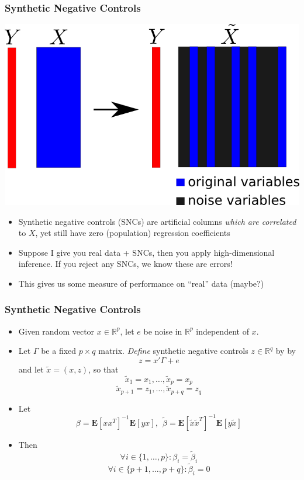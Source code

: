 \documentclass{beamer}
\newcommand{\E}{\textbf{E}}
\begin{document}
\begin{frame}
\frametitle{Synthetic Negative Controls}
\begin{center}
\includegraphics[scale = 0.35]{anc.png}
\end{center}
\begin{itemize}
\item Synthetic negative controls (SNCs) are artificial columns \emph{which are correlated} to $X$,
yet still have zero (population) regression coefficients
\item Suppose I give you real data + SNCs, then you apply high-dimensional inference.
If you reject any SNCs, we know these are errors!
\item This gives us some measure of performance on ``real'' data (maybe?)
\end{itemize}
\end{frame}


\begin{frame}
\frametitle{Synthetic Negative Controls}
\begin{itemize}
\item<1-> Given random vector $x \in \mathbb{R}^p$, let $e$ be noise in $\mathbb{R}^p$ independent of $x$.
\item<1-> Let $\Gamma$ be a fixed $p \times q$ matrix. \emph{Define} synthetic negative controls $z \in \mathbb{R}^{q}$ by
by
\[
z = x'\Gamma + e
\]
and let $\tilde{x} = (x, z)$, so that 
\[
\tilde{x}_1 = x_1,\hdots, \tilde{x}_p = x_p
\]
\[
\tilde{x}_{p+1} = z_1,\hdots, \tilde{x}_{p+q} = z_q
\]
\item<2-> Let
\[
\beta = \E[xx^T]^{-1}\E[yx], \ \ \tilde{\beta} = \E[\tilde{x}\tilde{x}^T]^{-1} \E[y\tilde{x}]
\]
\item<3-> Then
\[
\forall i \in \{1, \hdots, p\}: \beta_i = \tilde{\beta}_i
\]
\[
\forall i \in \{p+1,\hdots, p+q\}: \tilde{\beta}_i = 0
\]
\end{itemize}
\end{frame}
\end{document}
